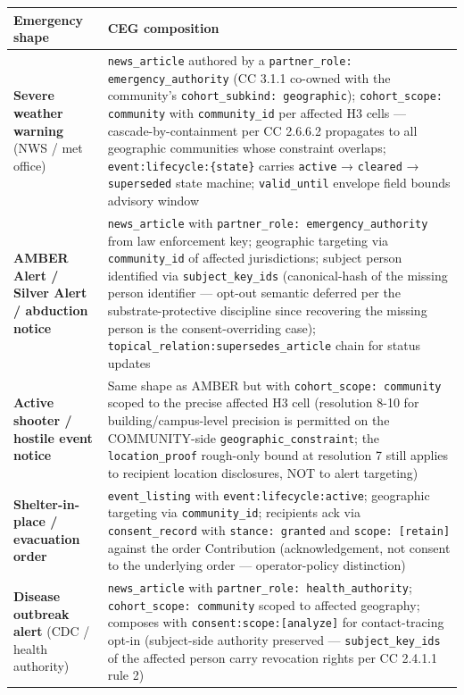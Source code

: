 \documentclass[11pt]{article}
\begin{document}
{\footnotesize
\begin{longtable}{|p{8.0cm}|p{8.0cm}|}\hline
\textbf{Emergency shape} & \textbf{CEG composition} \\ \hline\endhead
\textbf{Severe weather warning} (NWS / met office) & \texttt{news\_article} authored by a \texttt{partner\_role: emergency\_authority} (CC 3.1.1 co-owned with the community's \texttt{cohort\_subkind: geographic}); \texttt{cohort\_scope: community} with \texttt{community\_id} per affected H3 cells — cascade-by-containment per CC 2.6.6.2 propagates to all geographic communities whose constraint overlaps; \texttt{event:lifecycle:\{state\}} carries \texttt{active} → \texttt{cleared} → \texttt{superseded} state machine; \texttt{valid\_until} envelope field bounds advisory window \\ \hline
\textbf{AMBER Alert / Silver Alert / abduction notice} & \texttt{news\_article} with \texttt{partner\_role: emergency\_authority} from law enforcement key; geographic targeting via \texttt{community\_id} of affected jurisdictions; subject person identified via \texttt{subject\_key\_ids} (canonical-hash of the missing person identifier — opt-out semantic deferred per the substrate-protective discipline since recovering the missing person is the consent-overriding case); \texttt{topical\_relation:supersedes\_article} chain for status updates \\ \hline
\textbf{Active shooter / hostile event notice} & Same shape as AMBER but with \texttt{cohort\_scope: community} scoped to the precise affected H3 cell (resolution 8-10 for building/campus-level precision is permitted on the COMMUNITY-side \texttt{geographic\_constraint}; the \texttt{location\_proof} rough-only bound at resolution 7 still applies to recipient location disclosures, NOT to alert targeting) \\ \hline
\textbf{Shelter-in-place / evacuation order} & \texttt{event\_listing} with \texttt{event:lifecycle:active}; geographic targeting via \texttt{community\_id}; recipients ack via \texttt{consent\_record} with \texttt{stance: granted} and \texttt{scope: [retain]} against the order Contribution (acknowledgement, not consent to the underlying order — operator-policy distinction) \\ \hline
\textbf{Disease outbreak alert} (CDC / health authority) & \texttt{news\_article} with \texttt{partner\_role: health\_authority}; \texttt{cohort\_scope: community} scoped to affected geography; composes with \texttt{consent:scope:[analyze]} for contact-tracing opt-in (subject-side authority preserved — \texttt{subject\_key\_ids} of the affected person carry revocation rights per CC 2.4.1.1 rule 2) \\ \hline

\end{longtable}}
\end{document}
